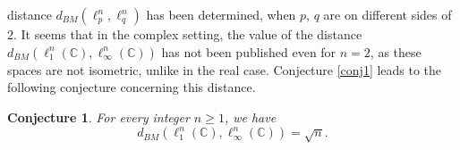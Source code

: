 \documentclass[12pt, a4paper]{article}
\theoremstyle{plain} %
\newtheorem{conjecture}[theorem]{Conjecture}
\theoremstyle{definition} %
\theoremstyle{remark} %
\begin{document}
distance $d_{BM}(\ell_p^n, \ell_q^n)$ has been determined, when $p$, $q$ are on different sides of $2$. It seems that in the complex setting, the value of the distance $d_{BM}(\ell_1^n(\mathbb{C}), \ell_{\infty}^n(\mathbb{C}))$ has not been published even for $n=2$, as these spaces are not isometric, unlike in the real case. Conjecture \ref{conj1} leads to the following conjecture concerning this distance.




\begin{conjecture}
\label{conj2}
For every integer $n \geq 1$, we have
\begin{equation}
d_{BM}(\ell_{1}^n(\mathbb{C}), \ell_{\infty}^n(\mathbb{C})) = \sqrt{n}.
\end{equation}
\end{conjecture}
\end{document}
